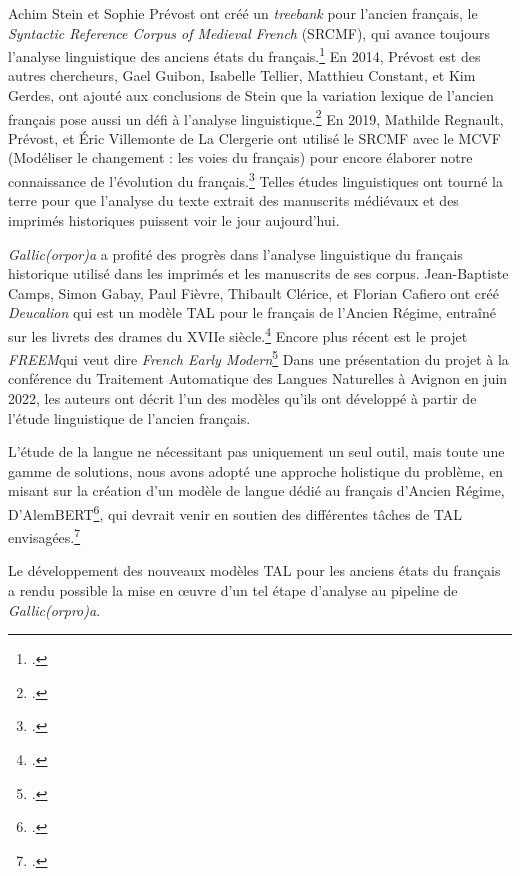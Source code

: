 \documentclass[class=article, crop=false]{standalone}
\begin{document}
Achim Stein et Sophie Prévost ont créé un \textit{treebank} pour l'ancien français, le \textit{Syntactic Reference Corpus of Medieval French} (SRCMF), qui avance toujours l'analyse linguistique des anciens états du français.\footcite{steinSyntacticReferenceCorpus2013} En 2014, Prévost est des autres chercheurs, Gael Guibon, Isabelle Tellier, Matthieu Constant, et Kim Gerdes, ont ajouté aux conclusions de Stein que la variation lexique de l'ancien français pose aussi un défi à l'analyse linguistique.\footcite{guibonParsingPoorlyStandardized2014} En 2019, Mathilde Regnault, Prévost, et Éric Villemonte de La Clergerie ont utilisé le SRCMF avec le MCVF (Modéliser le changement : les voies du français) pour encore élaborer notre connaissance de l'évolution du français.\footcite{regnaultChallengesLanguageChange2019} Telles études linguistiques ont tourné la terre pour que l'analyse du texte extrait des manuscrits médiévaux et des imprimés historiques puissent voir le jour aujourd'hui.

\textit{Gallic(orpor)a} a profité des progrès dans l'analyse linguistique du français historique utilisé dans les imprimés et les manuscrits de ses corpus. Jean-Baptiste Camps, Simon Gabay, Paul Fièvre, Thibault Clérice, et Florian Cafiero ont créé \textit{Deucalion} qui est un modèle \acrshort{TAL} pour le français de l'Ancien Régime, entraîné sur les livrets des drames du XVIIe siècle.\footcite{campsCorpusModelsLemmatisation2021} Encore plus récent est le projet \textit{F{\footnotesize RE}EM}qui veut dire \textit{French Early Modern}\footcite{gabayProjetFREEMRessources2022} Dans une présentation du projet à la conférence du Traitement Automatique des Langues Naturelles à Avignon en juin 2022,  les auteurs ont décrit l'un des modèles qu'ils ont développé à partir de l'étude linguistique de l'ancien français.
\begin{displayquote}
L’étude de la langue ne nécessitant pas uniquement un seul outil, mais toute une gamme de solutions, nous avons adopté une approche holistique du problème, en misant sur la création d’un modèle de langue dédié au français d’Ancien Régime, D’AlemBERT\footcite{gabayFreEMAlemBERT2022}, qui devrait venir en soutien des différentes tâches de TAL envisagées.\footcite{gabayProjetFREEMRessources2022} 
\end{displayquote}
Le développement des nouveaux modèles TAL pour les anciens états du français a rendu possible la mise en œuvre d'un tel étape d'analyse au pipeline de \textit{Gallic(orpro)a}.


\end{document}
